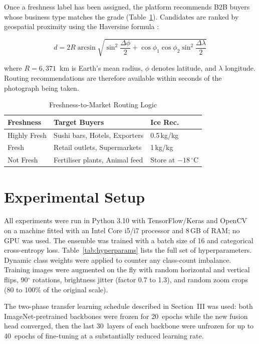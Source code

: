 \documentclass[conference]{IEEEtran}
\begin{document}
Once a freshness label has been assigned, the platform recommends B2B buyers whose business type matches the grade (Table~\ref{tab:routing}). Candidates are ranked by geospatial proximity using the Haversine formula \cite{ref_haversine}:

\begin{equation}
d = 2R \arcsin\sqrt{\sin^2\frac{\Delta\phi}{2} + \cos\phi_1 \cos\phi_2 \sin^2\frac{\Delta\lambda}{2}}
\end{equation}

where $R = 6{,}371$~km is Earth's mean radius, $\phi$ denotes latitude, and $\lambda$ longitude. Routing recommendations are therefore available within seconds of the photograph being taken.

\begin{table}[h]
\centering
\caption{Freshness-to-Market Routing Logic}
\label{tab:routing}
\begin{tabular}{lll}
\toprule
\textbf{Freshness} & \textbf{Target Buyers} & \textbf{Ice Rec.} \\
\midrule
Highly Fresh & Sushi bars, Hotels, Exporters & 0.5\,kg/kg \\
Fresh & Retail outlets, Supermarkets & 1\,kg/kg \\
Not Fresh & Fertiliser plants, Animal feed & Store at $-18\,^{\circ}$C \\
\bottomrule
\end{tabular}
\end{table}

\section{Experimental Setup}
All experiments were run in Python 3.10 with TensorFlow/Keras and OpenCV on a machine fitted with an Intel Core i5/i7 processor and 8\,GB of RAM; no GPU was used. The ensemble was trained with a batch size of 16 and categorical cross-entropy loss. Table~\ref{tab:hyperparams} lists the full set of hyperparameters. Dynamic class weights were applied to counter any class-count imbalance. Training images were augmented on the fly with random horizontal and vertical flips, 90$^{\circ}$ rotations, brightness jitter (factor 0.7 to 1.3), and random zoom crops (80 to 100\% of the original scale).

The two-phase transfer learning schedule described in Section~III was used: both ImageNet-pretrained backbones were frozen for 20~epochs while the new fusion head converged, then the last 30~layers of each backbone were unfrozen for up to 40~epochs of fine-tuning at a substantially reduced learning rate.
\end{document}
